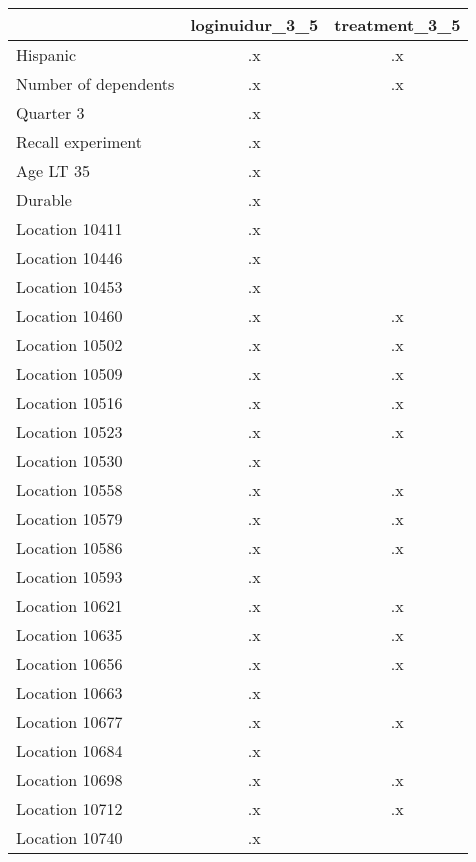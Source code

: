 \begin{tabular}{l*{2}{c}}
\hline\hline
                    &loginuidur\_3\_5&treatment\_3\_5\\
\hline
Hispanic            &          .x&          .x\\
Number of dependents&          .x&          .x\\
Quarter 3           &          .x&            \\
Recall experiment   &          .x&            \\
Age LT 35           &          .x&            \\
Durable             &          .x&            \\
Location 10411      &          .x&            \\
Location 10446      &          .x&            \\
Location 10453      &          .x&            \\
Location 10460      &          .x&          .x\\
Location 10502      &          .x&          .x\\
Location 10509      &          .x&          .x\\
Location 10516      &          .x&          .x\\
Location 10523      &          .x&          .x\\
Location 10530      &          .x&            \\
Location 10558      &          .x&          .x\\
Location 10579      &          .x&          .x\\
Location 10586      &          .x&          .x\\
Location 10593      &          .x&            \\
Location 10621      &          .x&          .x\\
Location 10635      &          .x&          .x\\
Location 10656      &          .x&          .x\\
Location 10663      &          .x&            \\
Location 10677      &          .x&          .x\\
Location 10684      &          .x&            \\
Location 10698      &          .x&          .x\\
Location 10712      &          .x&          .x\\
Location 10740      &          .x&            \\

\end{tabular}
